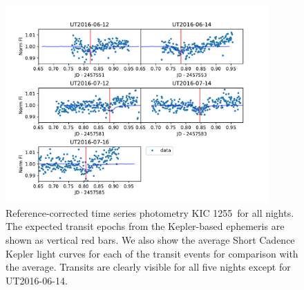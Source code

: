 \documentclass[twocolumn]{aastex61}
\newcommand{\shStar}{KIC 1255}
\begin{document}
\begin{figure}
\begin{centering}
\includegraphics[width=0.9\textwidth]{images/all_kic1255_phot/all_kic1255_refcor.pdf}
\caption{Reference-corrected time series photometry \shStar\ for all nights.
The expected transit epochs from the Kepler-based ephemeris \citep{vanWerkhoven2014} are shown as vertical red bars.
We also show the average Short Cadence Kepler light curves for each of the transit events for comparison with the average.
Transits are clearly visible for all five nights except for UT2016-06-14.}\label{fig:allNightrefCorrect}
\end{centering}
\end{figure}

\clearpage
\end{document}
